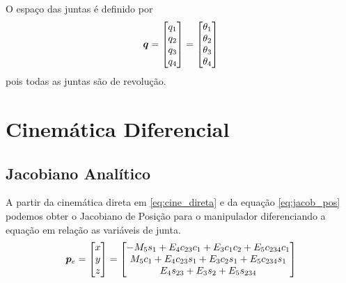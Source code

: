 O espaço das juntas é definido por 
\begin{equation} \label{joint_space}
\bm{q} = \begin{bmatrix}q_1 \\ q_2 \\ q_3 \\ q_4\end{bmatrix} = \begin{bmatrix}\theta_1 \\ \theta_2 \\ \theta_3 \\ \theta_4  \end{bmatrix}
\end{equation} 
pois todas as juntas são de revolução.

\section{Cinemática Diferencial}

\subsection{Jacobiano Analítico}
A partir da cinemática direta em \eqref{eq:cine_direta} e da equação \ref{eq:jacob_pos} podemos obter o Jacobiano de Posição para o manipulador diferenciando a equação em relação as variáveis de junta. 
\begin{equation}
\bm{p}_e = \begin{bmatrix}x \\ y \\ z\end{bmatrix} =
\begin{bmatrix}
   -M_5 s_1 + E_4 c_{23}c_1 + E_3 c_1 c_2 + E_5 c_{234} c_1 \\
     M_5 c_1+E_4 c_{23} s_1 + E_3 c_2 s_1 + E_5 c_{234} s_1 \\
   						 E_4 s_{23} + E_3 s_2 + E_5 s_{234} \\
\end{bmatrix}
\end{equation}

